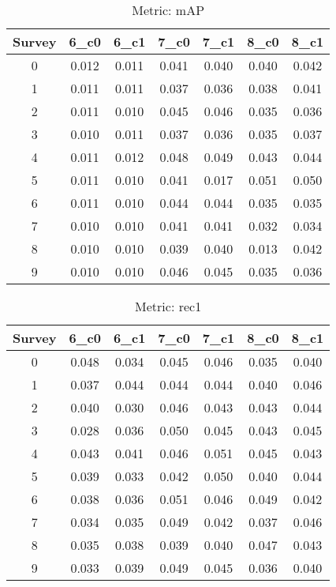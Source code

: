 \documentclass{article}
\begin{document}
\begin{table}[tbh]
\begin{center}
\begin{tabular}{|*{7}{c|}}
\hline
 Survey & 6\_c0 & 6\_c1 & 7\_c0 & 7\_c1 & 8\_c0 & 8\_c1 \\ 
\hline
0 & 0.012 & 0.011 & 0.041 & 0.040 & 0.040 & 0.042 \\ 
1 & 0.011 & 0.011 & 0.037 & 0.036 & 0.038 & 0.041 \\ 
2 & 0.011 & 0.010 & 0.045 & 0.046 & 0.035 & 0.036 \\ 
3 & 0.010 & 0.011 & 0.037 & 0.036 & 0.035 & 0.037 \\ 
4 & 0.011 & 0.012 & 0.048 & 0.049 & 0.043 & 0.044 \\ 
5 & 0.011 & 0.010 & 0.041 & 0.017 & 0.051 & 0.050 \\ 
6 & 0.011 & 0.010 & 0.044 & 0.044 & 0.035 & 0.035 \\ 
7 & 0.010 & 0.010 & 0.041 & 0.041 & 0.032 & 0.034 \\ 
8 & 0.010 & 0.010 & 0.039 & 0.040 & 0.013 & 0.042 \\ 
9 & 0.010 & 0.010 & 0.046 & 0.045 & 0.035 & 0.036 \\ 
\hline
\end{tabular}
\end{center}
\caption{Metric: mAP}
\end{table}


\begin{table}[tbh]
\begin{center}
\begin{tabular}{|*{7}{c|}}
\hline
 Survey & 6\_c0 & 6\_c1 & 7\_c0 & 7\_c1 & 8\_c0 & 8\_c1 \\ 
\hline
0 & 0.048 & 0.034 & 0.045 & 0.046 & 0.035 & 0.040 \\ 
1 & 0.037 & 0.044 & 0.044 & 0.044 & 0.040 & 0.046 \\ 
2 & 0.040 & 0.030 & 0.046 & 0.043 & 0.043 & 0.044 \\ 
3 & 0.028 & 0.036 & 0.050 & 0.045 & 0.043 & 0.045 \\ 
4 & 0.043 & 0.041 & 0.046 & 0.051 & 0.045 & 0.043 \\ 
5 & 0.039 & 0.033 & 0.042 & 0.050 & 0.040 & 0.044 \\ 
6 & 0.038 & 0.036 & 0.051 & 0.046 & 0.049 & 0.042 \\ 
7 & 0.034 & 0.035 & 0.049 & 0.042 & 0.037 & 0.046 \\ 
8 & 0.035 & 0.038 & 0.039 & 0.040 & 0.047 & 0.043 \\ 
9 & 0.033 & 0.039 & 0.049 & 0.045 & 0.036 & 0.040 \\ 
\hline
\end{tabular}
\end{center}
\caption{Metric: rec1}
\end{table}
\end{document}
